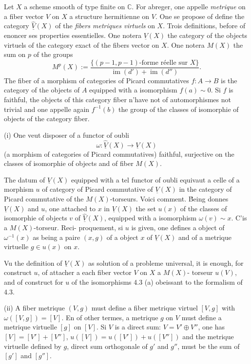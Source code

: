 \documentclass[12pt,a4paper]{article}
\theoremstyle{plain}
\theoremstyle{definition}
\DeclareMathOperator{\im}{im}
\newcommand{\CC}{\mathbb{C}}
\begin{document}
Let $X$ a scheme smooth of type finite on $\CC$. For abreger, one appelle
\emph{metrique} on a fiber vector $V$ on $X$ a structure hermitienne on $V$.
One se propose of define the category $\widehat{\underline{V}}(X)$ of the \emph{fibers metriques virtuels} on
$X$. Trois definitions, before of enoncer ses properties essentielles. One notera
$\underline{V}(X)$ the category of the objects virtuels of the category exact of the fibers vector
on $X$. One notera $M(X)$ the sum on $p$ of the groups
\[
M^p(X) := \frac{\{\text{$(p-1,p-1)$-forme r\'eelle sur $X$}\}}{\im(d') + \im(d'')} .
\]
The fiber of a morphism of categories of Picard commutatives $f: A \to B$ is the
category of the objects of $A$ equipped with a isomorphism $f(a) \sim 0$. Si $f$ is faithful,
the objects of this category fiber n'have not of automorphismes not trivial and
one appelle again $f^{-1}(b)$ the group of the classes of isomorphie of objects of the category
fiber.

\medskip

(i) One veut disposer of a functor of oubli
\[
\omega: \widehat{\underline{V}}(X) \to \underline{V}(X)
\]
(a morphism of categories of Picard commutatives) faithful, surjective on the
classes of isomorphie of objects and of fiber $M(X)$.

The datum of $\underline{V}(X)$ equipped with a tel functor of oubli equivaut a celle of a
morphism $u$ of category of Picard commutative of $\underline{V}(X)$ in the category of
Picard commutative of the $M(X)$-torseurs. Voici comment. \'Being donnes $\underline{V}(X)$ and
$u$, one attached to $x$ in $\underline{V}(X)$ the set $u(x)$ of the classes of isomorphie of objects
$v$ of $\widehat{\underline{V}}(X)$, equipped with a isomorphism $\omega(v) \sim x$. C'is a $M(X)$-torseur. Reci-
proquement, si $u$ is given, one defines a object of $\omega^{-1}(x)$ as being a paire
$(x, g)$ of a object $x$ of $\underline{V}(X)$ and of a metrique virtuelle $g \in u(x)$ on $x$.

Vu the definition of $\underline{V}(X)$ as solution of a probleme universal, it is enough,
for construct $u$, of attacher a each fiber vector $V$ on $X$ a $M(X)$-
torseur $u(V)$, and of construct for $u$ of the isomorphisms 4.3 (a) obeissant
to the formalism of 4.3.

\medskip

(ii) A fiber metrique $(V, g)$ must define a fiber metrique virtuel $[V, g]$
with $\omega([V, g]) = [V]$. En of other termes, a metrique $g$ on $V$ must define
a metrique virtuelle $[g]$ on $[V]$. Si $V$ is a direct sum: $V = V' \oplus V''$,
one has $[V] = [V'] + [V'']$, $u([V]) = u([V']) + u([V''])$ and the metrique virtuelle
defined by $g$, direct sum orthogonale of $g'$ and $g''$, must be the sum
of $[g']$ and $[g'']$.
\end{document}
